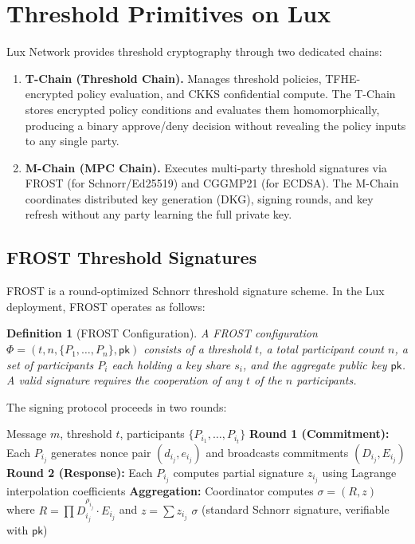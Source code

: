 \documentclass[11pt,a4paper]{article}
\newtheorem{definition}{Definition}
\begin{document}
\section{Threshold Primitives on Lux}\label{sec:primitives}

Lux Network provides threshold cryptography through two dedicated chains:

\begin{enumerate}
    \item \textbf{T-Chain (Threshold Chain).} Manages threshold policies,
    TFHE-encrypted policy evaluation, and CKKS confidential compute. The
    T-Chain stores encrypted policy conditions and evaluates them
    homomorphically, producing a binary approve/deny decision without
    revealing the policy inputs to any single party.

    \item \textbf{M-Chain (MPC Chain).} Executes multi-party threshold
    signatures via FROST (for Schnorr/Ed25519) and CGGMP21 (for ECDSA).
    The M-Chain coordinates distributed key generation (DKG), signing
    rounds, and key refresh without any party learning the full private key.
\end{enumerate}

\subsection{FROST Threshold Signatures}

FROST \cite{komlo2020frost} is a round-optimized Schnorr threshold signature
scheme. In the Lux deployment, FROST operates as follows:

\begin{definition}[FROST Configuration]
A FROST configuration $\Phi = (t, n, \{P_1, \ldots, P_n\}, \mathsf{pk})$
consists of a threshold $t$, a total participant count $n$, a set of
participants $P_i$ each holding a key share $s_i$, and the aggregate
public key $\mathsf{pk}$. A valid signature requires the cooperation
of any $t$ of the $n$ participants.
\end{definition}

The signing protocol proceeds in two rounds:

\begin{algorithm}[H]
\caption{FROST Threshold Signing (simplified)}
\label{alg:frost}
\begin{algorithmic}[1]
\Require Message $m$, threshold $t$, participants $\{P_{i_1}, \ldots, P_{i_t}\}$
\State \textbf{Round 1 (Commitment):} Each $P_{i_j}$ generates nonce pair $(d_{i_j}, e_{i_j})$ and broadcasts commitments $(D_{i_j}, E_{i_j})$
\State \textbf{Round 2 (Response):} Each $P_{i_j}$ computes partial signature $z_{i_j}$ using Lagrange interpolation coefficients
\State \textbf{Aggregation:} Coordinator computes $\sigma = (R, z)$ where $R = \prod D_{i_j}^{\rho_{i_j}} \cdot E_{i_j}$ and $z = \sum z_{i_j}$
\State \Return $\sigma$ (standard Schnorr signature, verifiable with $\mathsf{pk}$)
\end{algorithmic}
\end{algorithm}
\end{document}
